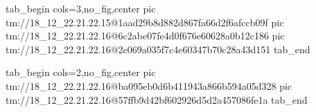  
 
 
 
 

\qqSecCmtScr


\ifcmt
  tab_begin cols=3,no_fig,center
    pic tm://18_12_22.21.22.15@1aad29b8d882d867fa66d2f6afccb09f
    pic tm://18_12_22.21.22.16@6c2abe07fe4d0f676e60628a0b12c186
    pic tm://18_12_22.21.22.16@2c069a035f7c4e60347b70c28a43d151
  tab_end
\fi


\ifcmt
  tab_begin cols=2,no_fig,center
    pic tm://18_12_22.21.22.16@ba095eb0d6b411943a866b594a05d328
    pic tm://18_12_22.21.22.16@57ffb9d42bf602926d5d2a457086fe1a
  tab_end
\fi

